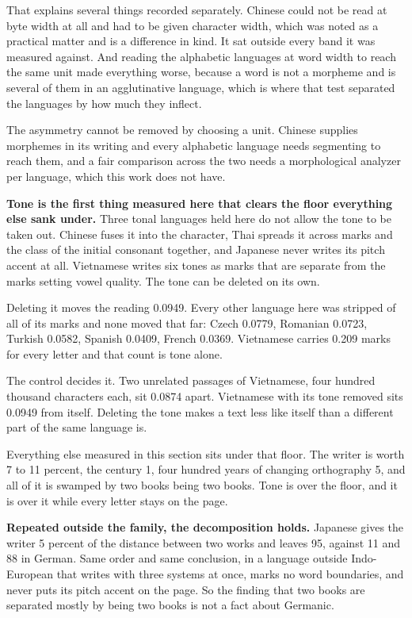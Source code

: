 That explains several things recorded separately. Chinese could not be read at byte width at all and had to be given character width, which was noted as a practical matter and is a difference in kind. It sat outside every band it was measured against. And reading the alphabetic languages at word width to reach the same unit made everything worse, because a word is not a morpheme and is several of them in an agglutinative language, which is where that test separated the languages by how much they inflect.

The asymmetry cannot be removed by choosing a unit. Chinese supplies morphemes in its writing and every alphabetic language needs segmenting to reach them, and a fair comparison across the two needs a morphological analyzer per language, which this work does not have.

\textbf{Tone is the first thing measured here that clears the floor everything else sank under.} Three tonal languages held here do not allow the tone to be taken out. Chinese fuses it into the character, Thai spreads it across marks and the class of the initial consonant together, and Japanese never writes its pitch accent at all. Vietnamese writes six tones as marks that are separate from the marks setting vowel quality. The tone can be deleted on its own.

Deleting it moves the reading 0.0949. Every other language here was stripped of all of its marks and none moved that far: Czech 0.0779, Romanian 0.0723, Turkish 0.0582, Spanish 0.0409, French 0.0369. Vietnamese carries 0.209 marks for every letter and that count is tone alone.

The control decides it. Two unrelated passages of Vietnamese, four hundred thousand characters each, sit 0.0874 apart. Vietnamese with its tone removed sits 0.0949 from itself. Deleting the tone makes a text less like itself than a different part of the same language is.

Everything else measured in this section sits under that floor. The writer is worth 7 to 11 percent, the century 1, four hundred years of changing orthography 5, and all of it is swamped by two books being two books. Tone is over the floor, and it is over it while every letter stays on the page.

\textbf{Repeated outside the family, the decomposition holds.} Japanese gives the writer 5 percent of the distance between two works and leaves 95, against 11 and 88 in German. Same order and same conclusion, in a language outside Indo-European that writes with three systems at once, marks no word boundaries, and never puts its pitch accent on the page. So the finding that two books are separated mostly by being two books is not a fact about Germanic.

